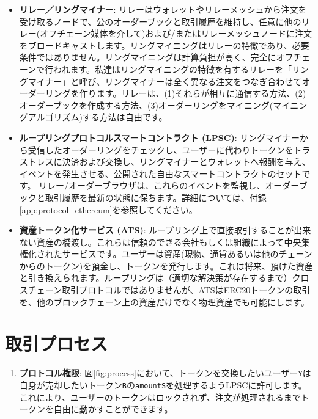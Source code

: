 \documentclass{article}
\begin{document}
\begin{multicols}{2}
\begin{itemize}
\item \textbf{リレー／リングマイナー}: リレーはウォレットやリレーメッシュから注文を受け取るノードで、公のオーダーブックと取引履歴を維持し、任意に他のリレー(オフチェーン媒体を介して)および/またはリレーメッシュノードに注文をブロードキャストします。リングマイニングはリレーの特徴であり、必要条件ではありません。リングマイニングは計算負担が高く、完全にオフチェーンで行われます。私達はリングマイニングの特徴を有するリレーを「リングマイナー」と呼び、リングマイナーは全く異なる注文をつなぎ合わせてオーダーリングを作ります。リレーは、(1)それらが相互に通信する方法、(2)オーダーブックを作成する方法、(3)オーダーリングをマイニング(マイニングアルゴリズム)する方法は自由です。

\item \textbf{ループリングプロトコルスマートコントラクト (LPSC)}: リングマイナーから受信したオーダーリングをチェックし、ユーザーに代わりトークンをトラストレスに決済および交換し、リングマイナーとウォレットへ報酬を与え、イベントを発生させる、公開された自由なスマートコントラクトのセットです。 リレー/オーダーブラウザは、これらのイベントを監視し、オーダーブックと取引履歴を最新の状態に保ちます。詳細については、付録\ref{app:protocol_ethereum}を参照してください。

\item \textbf{資産トークン化サービス (ATS)}: ループリング上で直接取引することが出来ない資産の橋渡し。これらは信頼のできる会社もしくは組織によって中央集権化されたサービスです。ユーザーは資産(現物、通貨あるいは他のチェーンからのトークン)を預金し、トークンを発行します。これは将来、預けた資産と引き換えられます。ループリングは（適切な解決策が存在するまで）クロスチェーン取引プロトコルではありませんが、ATSはERC20トークン\cite{ERC20}の取引を、他のブロックチェーン上の資産だけでなく物理資産でも可能にします。

\end{itemize}


\section{取引プロセス\label{sec:process}}



\begin{enumerate} 


\item \textbf{プロトコル権限}: 図\ref{fig:process}において、トークンを交換したいユーザー\verb|Y|は自身が売却したいトークン\verb|B|の\verb|amountS|を処理するようLPSCに許可します。これにより、ユーザーのトークンはロックされず、注文が処理されるまでトークンを自由に動かすことができます。


\end{enumerate}
\end{multicols}
\end{document}
